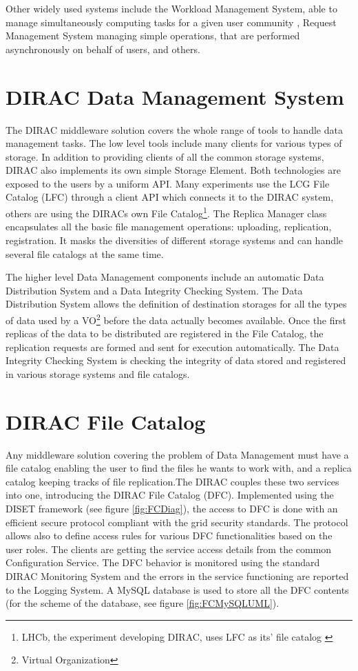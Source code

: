 Other widely used systems include the Workload Management System, able to manage simultaneously computing
tasks for a given user community \cite{WMS}, Request Management System \cite{RMS} managing simple operations, that 
are performed asynchronously on behalf of users, and others. 

\section{DIRAC Data Management System}

The DIRAC middleware solution covers the whole range of tools to handle data management tasks. The low level 
tools include many clients for various types of storage. In addition to providing clients of all 
the common storage systems, DIRAC also implements its own simple Storage Element. Both technologies are 
exposed to the users by a uniform API. Many experiments use the LCG
File Catalog (LFC) through a client API which connects it to the DIRAC system, others are using 
the DIRACs own File Catalog\footnote{LHCb, the experiment developing DIRAC, uses LFC as its' file catalog 
\cite{LHCbFC}}. 
The Replica Manager class encapsulates all the basic file 
management operations: uploading, replication, registration. It masks the diversities 
of different storage systems and can handle several file catalogs at the same time. 

The higher level Data Management components include an automatic Data Distribution System and
a Data Integrity Checking System. The Data Distribution System allows the definition of destination storages
for all the types of data used by a VO\footnote{Virtual Organization} before the data actually becomes available. 
Once the first replicas
of the data to be distributed are registered in the File Catalog, the replication requests are formed and
sent for execution automatically. The Data Integrity Checking System is checking the integrity of data stored and
registered in various storage systems and file catalogs. 

\section{DIRAC File Catalog}

Any middleware solution covering the problem of Data Management must have a file catalog enabling the user to  
find the files he wants to work with, and a replica catalog keeping tracks of file replication.The DIRAC 
couples these two services into one, introducing the DIRAC File Catalog (DFC)\cite{DFC}. 
Implemented using the DISET framework (see figure \ref{fig:FCDiag}), the access to DFC is done with an efficient secure 
protocol compliant with the grid security standards.
The protocol allows also to define access rules for various DFC functionalities based on the user roles. The
clients are getting the service access details from the common Configuration Service. The DFC behavior
is monitored using the standard DIRAC Monitoring System and the errors in the service functioning are
reported to the Logging System. A MySQL database is used to store all the DFC contents (for the scheme of the 
database, see figure \ref{fig:FCMySQLUML}). 

